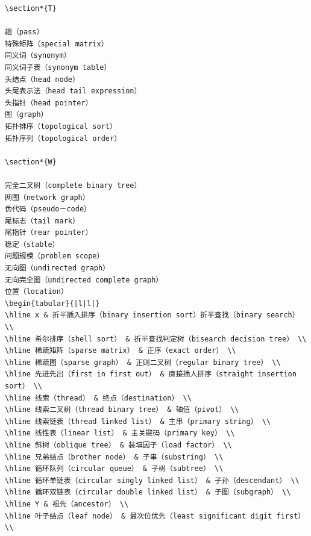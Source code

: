 \documentclass[10pt]{article}
\begin{document}
\begin{verbatim}
\section*{T}

趟（pass）
特殊矩阵（special matrix）
同义词（synonym）
同义词子表（synonym table）
头结点（head node）
头尾表示法（head tail expression）
头指针（head pointer）
图（graph）
拓扑排序（topological sort）
拓扑序列（topological order）

\section*{W}

完全二叉树（complete binary tree）
网图（network graph）
伪代码（pseudo－code）
尾标志（tail mark）
尾指针（rear pointer）
稳定（stable）
问题规模（problem scope）
无向图（undirected graph）
无向完全图（undirected complete graph）
位置（location）
\begin{tabular}{|l|l|}
\hline x & 折半插入排序（binary insertion sort）折半查找（binary search） \\
\hline 希尔排序（shell sort） & 折半查找判定树（bisearch decision tree） \\
\hline 稀疏矩阵（sparse matrix） & 正序（exact order） \\
\hline 稀疏图（sparse graph） & 正则二叉树（regular binary tree） \\
\hline 先进先出（first in first out） & 直接插人排序（straight insertion sort） \\
\hline 线索（thread） & 终点（destination） \\
\hline 线索二叉树（thread binary tree） & 轴值（pivot） \\
\hline 线索链表（thread linked list） & 主串（primary string） \\
\hline 线性表（linear list） & 主关键码（primary key） \\
\hline 斜树（oblique tree） & 装填因子（load factor） \\
\hline 兄弟结点（brother node） & 子串（substring） \\
\hline 循环队列（circular queue） & 子树（subtree） \\
\hline 循环单链表（circular singly linked list） & 子孙（descendant） \\
\hline 循环双链表（circular double linked list） & 子图（subgraph） \\
\hline Y & 祖先（ancestor） \\
\hline 叶子结点（leaf node） & 最次位优先（least significant digit first） \\

\end{verbatim}
\end{document}
